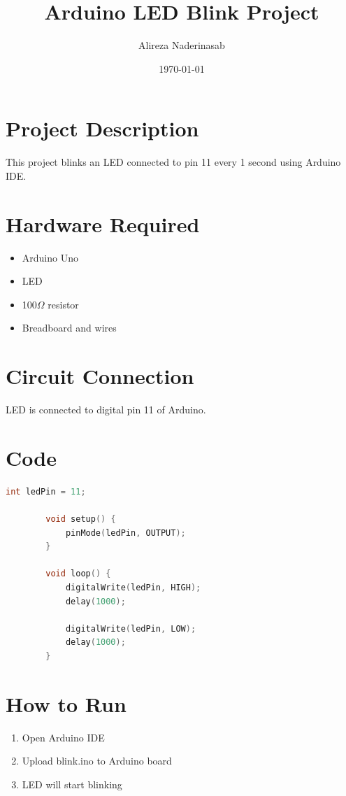 \documentclass[a4paper,12pt]{article}
\title{Arduino LED Blink Project}
\author{Alireza Naderinasab}
\date{\today}
\begin{document}
	
	\maketitle
	
	\section{Project Description}
	This project blinks an LED connected to pin 11 every 1 second using Arduino IDE.
	
	\section{Hardware Required}
	\begin{itemize}
		\item Arduino Uno
		\item LED
		\item 100$\Omega$ resistor
		\item Breadboard and wires
	\end{itemize}
	
	\section{Circuit Connection}
	LED is connected to digital pin 11 of Arduino.
	
	\section{Code}
	
	\begin{lstlisting}[language=C]
		int ledPin = 11;
		
		void setup() {
			pinMode(ledPin, OUTPUT);
		}
		
		void loop() {
			digitalWrite(ledPin, HIGH);
			delay(1000);
			
			digitalWrite(ledPin, LOW);
			delay(1000);
		}
	\end{lstlisting}
	
	\section{How to Run}
	\begin{enumerate}
		\item Open Arduino IDE
		\item Upload blink.ino to Arduino board
		\item LED will start blinking
	\end{enumerate}
\end{document}
